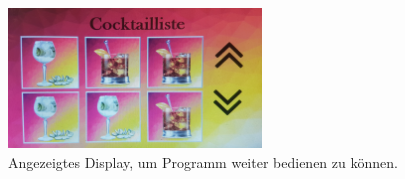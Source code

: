 \begin{enumerate}
\begin{figure}[h!]
	\centering	\includegraphics[width=0.6\textwidth]{graphics/Display_Cocktailliste.jpg}
	\caption{Angezeigtes Display, um Programm weiter bedienen zu können.} 
	\label{fig:Hardware_Cocktailliste}
\end{figure}
\end{enumerate}